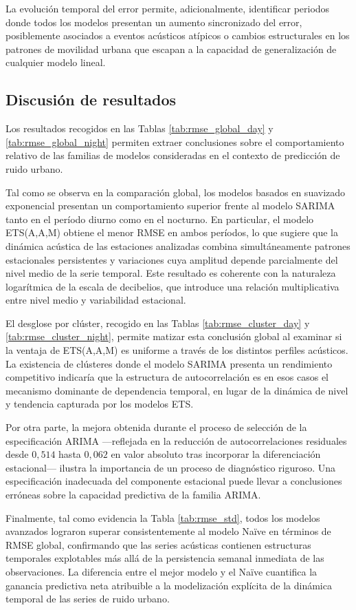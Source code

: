 La evolución temporal del error permite, adicionalmente, identificar periodos donde todos los modelos presentan un aumento sincronizado del error, posiblemente asociados a eventos acústicos atípicos o cambios estructurales en los patrones de movilidad urbana que escapan a la capacidad de generalización de cualquier modelo lineal.

\subsection{Discusión de resultados}
\label{cap5:comparacion:discusion}

Los resultados recogidos en las Tablas \ref{tab:rmse_global_day} y \ref{tab:rmse_global_night} permiten extraer conclusiones sobre el comportamiento relativo de las familias de modelos consideradas en el contexto de predicción de ruido urbano.

Tal como se observa en la comparación global, los modelos basados en suavizado exponencial presentan un comportamiento superior frente al modelo SARIMA tanto en el período diurno como en el nocturno. En particular, el modelo ETS(A,A,M) obtiene el menor RMSE en ambos períodos, lo que sugiere que la dinámica acústica de las estaciones analizadas combina simultáneamente patrones estacionales persistentes y variaciones cuya amplitud depende parcialmente del nivel medio de la serie temporal. Este resultado es coherente con la naturaleza logarítmica de la escala de decibelios, que introduce una relación multiplicativa entre nivel medio y variabilidad estacional.

El desglose por clúster, recogido en las Tablas \ref{tab:rmse_cluster_day} y \ref{tab:rmse_cluster_night}, permite matizar esta conclusión global al examinar si la ventaja de ETS(A,A,M) es uniforme a través de los distintos perfiles acústicos. La existencia de clústeres donde el modelo SARIMA presenta un rendimiento competitivo indicaría que la estructura de autocorrelación es en esos casos el mecanismo dominante de dependencia temporal, en lugar de la dinámica de nivel y tendencia capturada por los modelos ETS.

Por otra parte, la mejora obtenida durante el proceso de selección de la especificación ARIMA —reflejada en la reducción de autocorrelaciones residuales desde $0{,}514$ hasta $0{,}062$ en valor absoluto tras incorporar la diferenciación estacional— ilustra la importancia de un proceso de diagnóstico riguroso. Una especificación inadecuada del componente estacional puede llevar a conclusiones erróneas sobre la capacidad predictiva de la familia ARIMA.

Finalmente, tal como evidencia la Tabla \ref{tab:rmse_std}, todos los modelos avanzados lograron superar consistentemente al modelo Naïve en términos de RMSE global, confirmando que las series acústicas contienen estructuras temporales explotables más allá de la persistencia semanal inmediata de las observaciones. La diferencia entre el mejor modelo y el Naïve cuantifica la ganancia predictiva neta atribuible a la modelización explícita de la dinámica temporal de las series de ruido urbano.
